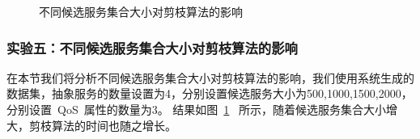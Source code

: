 \begin{figure}[!thb]
 \begin{minipage}[b]{1\linewidth} %
    \centering
    \caption{不同候选服务集合大小对剪枝算法的影响}
    \label{F:Fig_Exp EffeRtDiffCanDiffAlgo}
  \end{minipage}%
\end{figure}

\subsubsection{实验五：不同候选服务集合大小对剪枝算法的影响}

在本节我们将分析不同候选服务集合大小对剪枝算法的影响，我们使用系统生成的数据集，抽象服务的数量设置为4，分别设置候选服务大小为500,1000,1500,2000，分别设置~QoS~属性的数量为3。 结果如图~\ref{F:Fig_Exp EffeRtDiffCanDiffAlgo}~ 所示，随着候选服务集合大小增大，剪枝算法的时间也随之增长。



%
%

